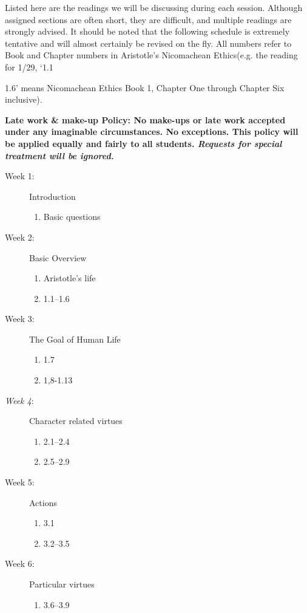 \documentclass[article,oneside]{memoir}
\begin{document}
Listed here are the readings we will be discussing during each session.  Although assigned sections are often short, they are difficult, and multiple readings are strongly advised.  It should be noted that the following schedule is extremely tentative and will almost certainly be revised on the fly.  All numbers refer to Book and Chapter numbers in Aristotle's Nicomachean Ethics(e.g.  the reading for 1/29, `1.1{1.6' means Nicomachean Ethics Book 1, Chapter One through Chapter Six inclusive).


\noindent \textbf{Late work \& make-up Policy:  No make-ups or late work accepted under any imaginable circumstances. No exceptions. This policy will be applied equally and fairly to all students. \emph{Requests for special treatment will be ignored.}}

\begin{description}

\item[Week 1:] Introduction
\begin{enumerate}
\item Basic questions
\end{enumerate}

\item[Week 2:]  Basic Overview
\begin{enumerate}
\item Aristotle's life
\item 1.1--1.6
\end{enumerate}

\item[Week 3:]  The Goal of Human Life
\begin{enumerate}
\item 1.7
\item 1,8-1.13
\end{enumerate}

\item[\textit{Week 4}: ] Character related virtues 
\begin{enumerate}
\item 2.1--2.4
\item 2.5--2.9
\end{enumerate}


\item[Week 5: ] Actions
\begin{enumerate}
\item 3.1
\item 3.2--3.5 
 \end{enumerate}
 
\item[Week 6:] Particular virtues
\begin{enumerate}
\item 3.6--3.9
\end{enumerate}



\end{description}}
\end{document}
